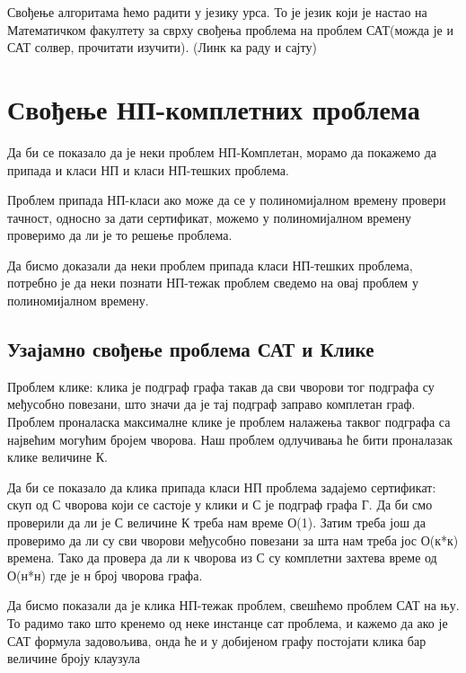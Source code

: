 \documentclass[12pt,oneside]{memoir}
\begin{document}
Свођење алгоритама ћемо радити у језику урса. То је језик који је настао на Математичком факултету за сврху свођења проблема на проблем САТ(можда је и САТ солвер, прочитати изучити). (Линк ка раду и сајту)

\section{Свођење НП-комплетних проблема}

Да би се показало да је неки проблем НП-Комплетан, морамо да покажемо да припада и класи НП и класи НП-тешких проблема. 

Проблем припада НП-класи ако може да се у  полиномијалном времену провери тачност, односно за дати сертификат, можемо у полиномијалном времену проверимо да ли је то решење проблема.

Да бисмо доказали да неки проблем припада класи НП-тешких проблема, потребно је да неки познати НП-тежак проблем сведемо на овај проблем у полиномијалном времену.

\subsection{Узајамно свођење проблема САТ и Клике}
Проблем клике:
клика је подграф графа такав да сви чворови тог подграфа су међусобно повезани, што значи да је тај подграф заправо комплетан граф. Проблем проналаска максималне клике је проблем налажења таквог подграфа са највећим могућим бројем чворова. Наш проблем одлучивања ће бити проналазак клике величине К.

Да би се показало да клика припада класи НП проблема задајемо сертификат: скуп од С чворова који се састоје у клики и С је подграф графа Г.
Да би смо проверили да ли је С величине К треба нам време О(1). Затим треба још да проверимо да ли су сви чворови међусобно повезани за шта нам треба јос О(к*к) времена. Тако да провера да ли к чворова из С су комплетни захтева време од О(н*н) где је н број чворова графа.

Да бисмо показали да је клика НП-тежак проблем, свешћемо проблем САТ на њу. То радимо тако што кренемо од неке инстанце сат проблема, и кажемо да ако је САТ формула задовољива, онда ће и у добијеном графу постојати клика бар величине броју клаузула
\end{document}
